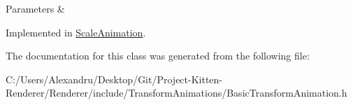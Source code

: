 \begin{DoxyParams}{Parameters}
{\em } & \\
\hline
\end{DoxyParams}


Implemented in \hyperlink{class_scale_animation_aaebd2e003860789ed140d42bd87e68bb}{Scale\+Animation}.



The documentation for this class was generated from the following file\+:\begin{DoxyCompactItemize}
\item 
C\+:/\+Users/\+Alexandru/\+Desktop/\+Git/\+Project-\/\+Kitten-\/\+Renderer/\+Renderer/include/\+Transform\+Animations/Basic\+Transform\+Animation.\+h\end{DoxyCompactItemize}
